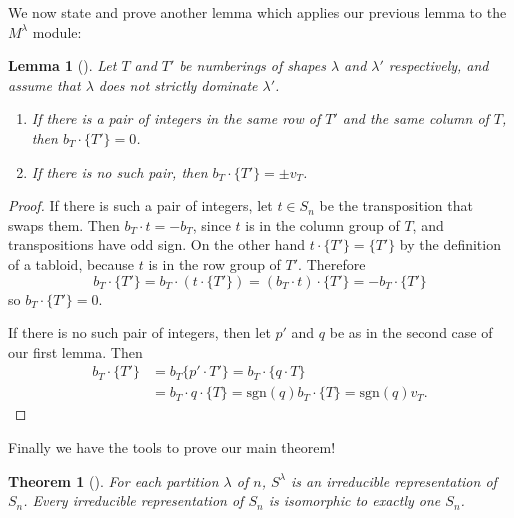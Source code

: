 \documentclass[12pt,twoside]{reedthesis}
\theoremstyle{plain}   %
\newtheorem{thm}{Theorem}[section] %
\newtheorem{lemma}{Lemma}[section]
\theoremstyle{definition}
\theoremstyle{remark}
\numberwithin{equation}{section}
\def\sgn{\mathrm{sgn}}
\begin{document}
   We now state and prove another lemma which applies our previous lemma to the $M^\lambda$ module:
   \begin{lemma}[{\cite[Lemma 7.2]{fulton}}]\label{lem2}
     Let $T$ and $T'$ be numberings of shapes $\lambda$ and $\lambda'$ respectively,
     and assume that $\lambda$ does not strictly dominate $\lambda'$. \\
     \begin{enumerate}
       
     \item If there is a pair of integers in the same row of $T'$ and the same column of $T$, then $b_T \cdot \{T'\} = 0$.
     \item If there is no such pair, then $b_T \cdot \{T'\} = \pm v_T$.
     \end{enumerate}
   \end{lemma}
   \begin{proof}    
     If there is such a pair of integers, let $t \in S_n$ be the transposition that swaps them.
     Then $b_T \cdot t = -b_T$, since $t$ is in the column group of $T$, and transpositions have odd sign.
     On the other hand $t \cdot \{T'\} = \{T'\}$ by the definition of a tabloid, because $t$ is in the row group of $T'$.
     Therefore
     \[b_T \cdot \{T'\} = b_T \cdot (t \cdot \{T'\}) = (b_T \cdot t) \cdot \{T'\} = - b_T \cdot \{T'\}\]
     so $b_T \cdot \{T'\} = 0$.\par
     If there is no such pair of integers, then let $p'$ and $q$ be as in the second case of our first lemma.
     Then
     \begin{align*}
       b_T \cdot \{ T'\} &=b_T \{p' \cdot T'\} = b_T \cdot \{ q \cdot T\} \\
                         &= b_T \cdot q \cdot \{T\} = \sgn(q) b_T \cdot \{T\} = \sgn(q) v_T.
     \end{align*}
   \end{proof}
   Finally we have the tools to prove our main theorem!
   \begin{thm}[{\cite[ Pg. 87-88]{fulton}}]
     For each partition $\lambda$ of $n$, $S^\lambda$ is an irreducible representation of $S_n$. Every irreducible representation of
     $S_n$ is isomorphic to exactly one $S_n$.
   \end{thm}
\end{document}
